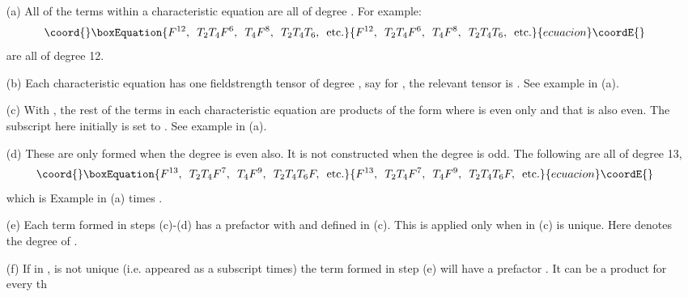 \documentclass[a4paper,twocolumn]{article}
\begin{document}
\begin{enumerate}
\item[(a)] All of the terms within a characteristic equation are all of degree
\coordHE{}. For example:
\begin{equation}\coord{}\boxEquation{
    F^{12},\,\,\,T_2T_4F^6,\,\,\,T_4F^8,\,\,\,T_2T_4T_6,\,\,\,\mbox{etc.}
}{
    F^{12},\,\,\,T_2T_4F^6,\,\,\,T_4F^8,\,\,\,T_2T_4T_6,\,\,\,\mbox{etc.}
}{ecuacion}\coordE{}\end{equation}
are all of degree 12.
\item[(b)] Each characteristic equation has one fieldstrength tensor of
degree \coordHE{}, say for \coordHE{}, the relevant tensor is \coordHE{}. See
example in (a).
\item[(c)]  With \coordHE{}, the rest
of the terms in each characteristic equation are products of the
form \coordHE{} where \coordHE{} is even only and that \coordHE{} is also even. The subscript here initially is set to
\coordHE{}. See example in (a).
\item[(d)] These are only formed when the
degree is even also. It is not constructed when the degree is odd.
The following are all of degree 13,
\begin{equation}\coord{}\boxEquation{
    F^{13},\,\,\,T_2T_4F^7,\,\,\,T_4F^9,\,\,\,T_2T_4T_6F,\,\,\,\mbox{etc.}
}{
    F^{13},\,\,\,T_2T_4F^7,\,\,\,T_4F^9,\,\,\,T_2T_4T_6F,\,\,\,\mbox{etc.}
}{ecuacion}\coordE{}\end{equation}
which is Example in (a) times \coordHE{}.
\item[(e)] Each term formed in steps (c)-(d) has a prefactor
\coordHE{} with \coordHE{} and \coordHE{} defined in (c). This is
applied only when \coordHE{} in (c) is unique. Here \coordHE{} denotes the
degree of \coordHE{}.
\item[(f)] If in \coordHE{}, \coordHE{} is not unique (i.e.
\coordHE{} appeared as a subscript \coordHE{} times) the term formed in step
(e) will have a prefactor \coordHE{}. It can be a
product \coordHE{} for every \coordHE{}th

\end{enumerate}
\end{document}
